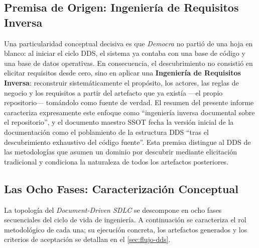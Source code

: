 \subsection{Premisa de Origen: Ingeniería de Requisitos Inversa}
\label{subsec:dds_inicio}

Una particularidad conceptual decisiva es que \textit{Democra} no partió de una
hoja en blanco: al iniciar el ciclo DDS, el sistema ya contaba con una base de
código y una base de datos operativas. En consecuencia, el descubrimiento no
consistió en elicitar requisitos desde cero, sino en aplicar una
\textbf{Ingeniería de Requisitos Inversa}: reconstruir sistemáticamente el
propósito, los actores, las reglas de negocio y los requisitos a partir del
artefacto que ya existía ---el propio repositorio--- tomándolo como fuente de verdad.
El resumen del presente informe caracteriza expresamente este enfoque como
``ingeniería inversa documental sobre el repositorio'', y el documento maestro
SSOT fecha la versión inicial de la documentación como el poblamiento de la
estructura DDS ``tras el descubrimiento exhaustivo del código fuente''. Esta
premisa distingue al DDS de las metodologías que asumen un dominio por descubrir
mediante elicitación tradicional y condiciona la naturaleza de todos los
artefactos posteriores.

\subsection{Las Ocho Fases: Caracterización Conceptual}
\label{subsec:dds_fases}

La topología del \textit{Document-Driven SDLC} se descompone en ocho fases
secuenciales del ciclo de vida de ingeniería. A continuación se caracteriza el rol
metodológico de cada una; su ejecución concreta, los artefactos generados y los
criterios de aceptación se detallan en el \autoref{sec:flujo-dds}.

